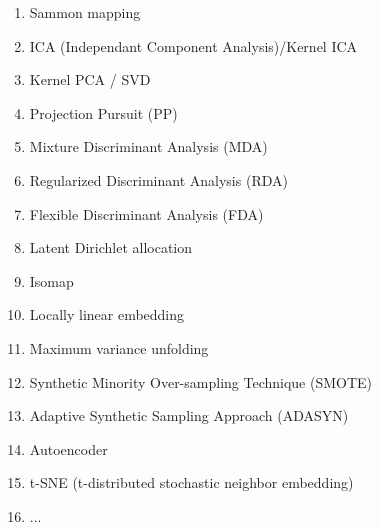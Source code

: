 \begin{itemize}
\begin{multicols}{2}
\begin{enumerate}
			\item Sammon mapping
			\item ICA (Independant Component Analysis)/Kernel ICA
			\item Kernel PCA / SVD
			\item Projection Pursuit (PP) 
			\item Mixture Discriminant Analysis (MDA)
			\item Regularized Discriminant Analysis (RDA)
			\item Flexible Discriminant Analysis (FDA)
			\item Latent Dirichlet allocation
			\item Isomap
			\item Locally linear embedding
			\item Maximum variance unfolding
			\item Synthetic Minority Over-sampling Technique (SMOTE)
			\item Adaptive Synthetic Sampling Approach (ADASYN)
			\item Autoencoder
			\item t-SNE (t-distributed stochastic neighbor embedding) 
			\item ...
		\end{enumerate}
		\end{multicols}
		

\end{itemize}
